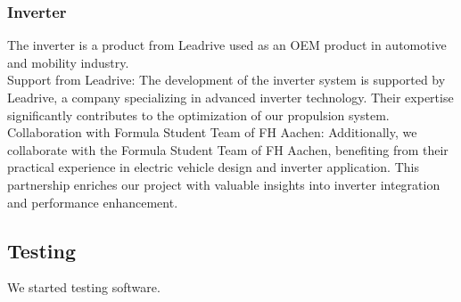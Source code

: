 \subsubsection{Inverter}
The inverter is a product from Leadrive used as an OEM product in automotive and mobility industry. \\

    Support from Leadrive: The development of the inverter system is supported by Leadrive, a company specializing in advanced inverter technology. Their expertise significantly contributes to the optimization of our propulsion system.
    Collaboration with Formula Student Team of FH Aachen: Additionally, we collaborate with the Formula Student Team of FH Aachen, benefiting from their practical experience in electric vehicle design and inverter application. This partnership enriches our project with valuable insights into inverter integration and performance enhancement.

\subsection{Testing}
We started testing software.

